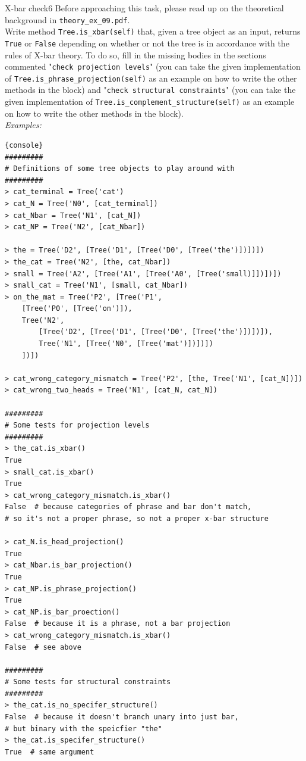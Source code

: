 \begin{task}{X-bar check}{6}
Before approaching this task, please read up on the theoretical background in \texttt{theory\_ex\_09.pdf}.\\

Write method \texttt{Tree.is\_xbar(self)} that, given a tree object as an input, returns \texttt{True} or \texttt{False} depending on whether or not the tree is in accordance with the rules of X-bar theory. To do so, fill in the missing bodies in the sections commented "\texttt{check projection levels}" (you can take the given implementation of \texttt{Tree.is\_phrase\_projection(self)} as an example on how to write the other methods in the block) and "\texttt{check structural constraints}" (you can take the given implementation of \texttt{Tree.is\_complement\_structure(self)} as an example on how to write the other methods in the block).\\

\textit{Examples:}\begin{lstlisting}{console}
#########
# Definitions of some tree objects to play around with
#########
> cat_terminal = Tree('cat')
> cat_N = Tree('N0', [cat_terminal])
> cat_Nbar = Tree('N1', [cat_N])
> cat_NP = Tree('N2', [cat_Nbar])

> the = Tree('D2', [Tree('D1', [Tree('D0', [Tree('the')])])])
> the_cat = Tree('N2', [the, cat_Nbar])
> small = Tree('A2', [Tree('A1', [Tree('A0', [Tree('small)]])])])
> small_cat = Tree('N1', [small, cat_Nbar])
> on_the_mat = Tree('P2', [Tree('P1',
    [Tree('P0', [Tree('on')]),
    Tree('N2',
        [Tree('D2', [Tree('D1', [Tree('D0', [Tree('the')])])]),
        Tree('N1', [Tree('N0', [Tree('mat')])])])
    ])])

> cat_wrong_category_mismatch = Tree('P2', [the, Tree('N1', [cat_N])])
> cat_wrong_two_heads = Tree('N1', [cat_N, cat_N])

#########
# Some tests for projection levels
#########
> the_cat.is_xbar()
True
> small_cat.is_xbar()
True
> cat_wrong_category_mismatch.is_xbar()
False  # because categories of phrase and bar don't match,
# so it's not a proper phrase, so not a proper x-bar structure

> cat_N.is_head_projection()
True
> cat_Nbar.is_bar_projection()
True
> cat_NP.is_phrase_projection()
True
> cat_NP.is_bar_proection()
False  # because it is a phrase, not a bar projection
> cat_wrong_category_mismatch.is_xbar()
False  # see above

#########
# Some tests for structural constraints
#########
> the_cat.is_no_specifer_structure()
False  # because it doesn't branch unary into just bar,
# but binary with the speicfier "the"
> the_cat.is_specifer_structure()
True  # same argument


\end{lstlisting}
\end{task}
